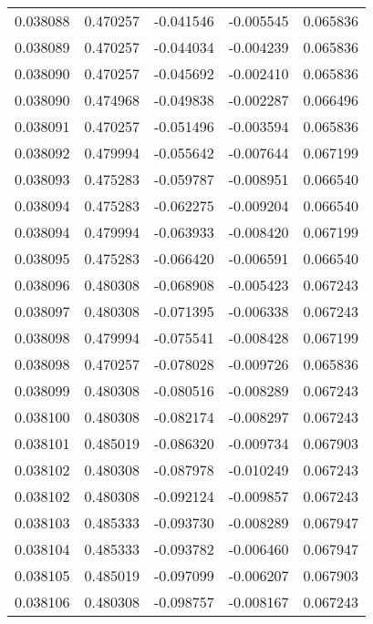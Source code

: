 \begin{tabular}{lrrrr}
0.038088    &  0.470257 & -0.041546 & -0.005545 &             0.065836 \\
0.038089    &  0.470257 & -0.044034 & -0.004239 &             0.065836 \\
0.038090    &  0.470257 & -0.045692 & -0.002410 &             0.065836 \\
0.038090    &  0.474968 & -0.049838 & -0.002287 &             0.066496 \\
0.038091    &  0.470257 & -0.051496 & -0.003594 &             0.065836 \\
0.038092    &  0.479994 & -0.055642 & -0.007644 &             0.067199 \\
0.038093    &  0.475283 & -0.059787 & -0.008951 &             0.066540 \\
0.038094    &  0.475283 & -0.062275 & -0.009204 &             0.066540 \\
0.038094    &  0.479994 & -0.063933 & -0.008420 &             0.067199 \\
0.038095    &  0.475283 & -0.066420 & -0.006591 &             0.066540 \\
0.038096    &  0.480308 & -0.068908 & -0.005423 &             0.067243 \\
0.038097    &  0.480308 & -0.071395 & -0.006338 &             0.067243 \\
0.038098    &  0.479994 & -0.075541 & -0.008428 &             0.067199 \\
0.038098    &  0.470257 & -0.078028 & -0.009726 &             0.065836 \\
0.038099    &  0.480308 & -0.080516 & -0.008289 &             0.067243 \\
0.038100    &  0.480308 & -0.082174 & -0.008297 &             0.067243 \\
0.038101    &  0.485019 & -0.086320 & -0.009734 &             0.067903 \\
0.038102    &  0.480308 & -0.087978 & -0.010249 &             0.067243 \\
0.038102    &  0.480308 & -0.092124 & -0.009857 &             0.067243 \\
0.038103    &  0.485333 & -0.093730 & -0.008289 &             0.067947 \\
0.038104    &  0.485333 & -0.093782 & -0.006460 &             0.067947 \\
0.038105    &  0.485019 & -0.097099 & -0.006207 &             0.067903 \\
0.038106    &  0.480308 & -0.098757 & -0.008167 &             0.067243 \\

\end{tabular}
